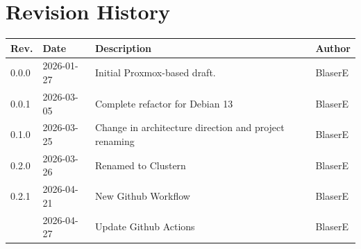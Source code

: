 \chapter*{Revision History}

\noindent %
\begin{tabularx}{\textwidth}{l l X l}
	\toprule
	\textbf{Rev.} & \textbf{Date} & \textbf{Description} & \textbf{Author} \\ \midrule
	0.0.0 & 2026-01-27 & Initial Proxmox-based draft. & BlaserE \\
	0.0.1 & 2026-03-05 & Complete refactor for Debian 13 & BlaserE \\ 
	0.1.0 & 2026-03-25 & Change in architecture direction and project renaming & BlaserE \\
	0.2.0 & 2026-03-26 & Renamed to Clustern & BlaserE \\ 
	0.2.1 & 2026-04-21 & New Github Workflow & BlaserE \\
	\docversion & 2026-04-27 & Update Github Actions & BlaserE \\ \bottomrule
\end{tabularx}

	